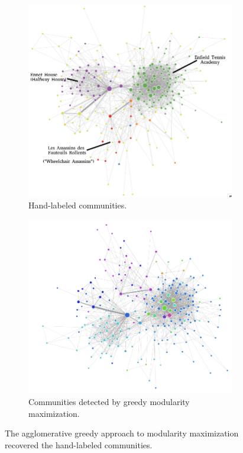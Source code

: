 \begin{figure}[ht]
    \centering
    \begin{subfigure}{0.4\textwidth}
        \includegraphics[width=1.\textwidth]{images/labeled_community_with_labels.png}
        \caption{Hand-labeled communities.}
    \end{subfigure}
    \begin{subfigure}{0.4\textwidth}
        \includegraphics[width=1.\textwidth]{images/greedy_community.png}
        \caption{Communities detected by greedy modularity maximization.}
    \end{subfigure}
    \caption{The agglomerative greedy approach to modularity maximization recovered the hand-labeled communities.}
    \label{fig:modularity}
\end{figure}

